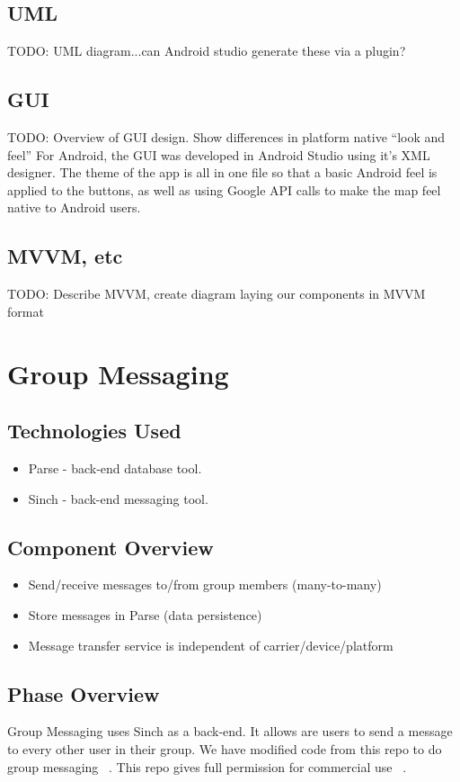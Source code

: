  \subsection{UML}
 TODO: UML diagram...can Android studio generate these via a plugin?
 
 \subsection{GUI}
 TODO: Overview of GUI design. Show differences in platform native ``look and feel''
 For Android, the GUI was developed in Android Studio using it's XML designer. The theme of the app is all in one file so that a basic Android feel is applied to the buttons, as well as using Google API calls to make the map feel native to Android users.
 
 \subsection{MVVM, etc}
 TODO: Describe MVVM, create diagram laying our components in MVVM format

\section{Group Messaging }

\subsection{Technologies  Used}
\begin{itemize}
  \item Parse - back-end database tool.
  \item Sinch - back-end messaging tool.
\end{itemize}

\subsection{Component  Overview}
\begin{itemize}
  \item Send/receive messages to/from group members (many-to-many)
  \item Store messages in Parse (data persistence)
  \item Message transfer service is independent of carrier/device/platform
\end{itemize} 

\subsection{Phase Overview}
Group Messaging uses Sinch as a back-end. It allows are users to send a message to every other user in their group. We have modified code from this repo to do group messaging ~\cite{Choset: sinch/android-messaging-tutorial, https://github.com/sinch/android-messaging-tutorial}. This repo gives full permission for commercial use ~\cite{Choset: License, https://github.com/sinch/android-messaging-tutorial/blob/master/LICENSE}. 

